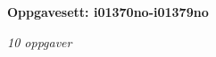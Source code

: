 \centerline{\bf Oppgavesett: i01370no-i01379no}
\vskip 10pt
\centerline{\it 10 oppgaver}\vskip 10pt
\vskip 10pt
